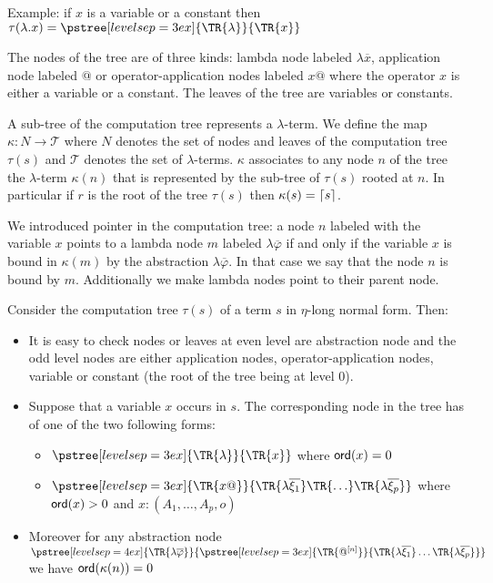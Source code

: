 Example: if $x$ is a variable or a constant then
$ \cmptre{\lambda . x} =
  \pstree[levelsep=3ex]
    { \TR{\lambda } }
    { \TR{x}
    }$

The nodes of the tree are of three kinds: lambda node labeled
 $\lambda \overline{x}$, application node labeled $@$ or
operator-application nodes labeled $x @$ where the operator $x$ is
either a variable or a constant. The leaves of the tree are
variables or constants.

A sub-tree of the computation tree represents a $\lambda$-term. We
define the map $\kappa : N \rightarrow \mathcal{T}$ where $N$
denotes the set of nodes and leaves of the computation tree
$\tau(s)$ and $\mathcal{T}$ denotes the set of $\lambda$-terms.
$\kappa$ associates to any node $n$ of the tree the $\lambda$-term
$\kappa(n)$ that is represented by the sub-tree of $\tau(s)$ rooted
at $n$. In particular if $r$ is the root of the tree $\tau(s)$ then
$\kappa(s) = \lceil s\rceil$.

We introduced pointer in the computation tree: a node $n$ labeled
with the variable $x$ points to a lambda node $m$ labeled $\lambda
\overline{\varphi}$ if and only if the variable $x$ is bound in
$\kappa(m)$ by the abstraction $\lambda \overline{\varphi}$. In that
case we say that the node $n$ is bound by $m$. Additionally we make
lambda nodes point to their parent node.


Consider the computation tree $\tau(s)$ of a term $s$ in $\eta$-long normal form. Then:
\begin{itemize}
\item It is easy to check nodes or leaves at even level are abstraction
node and the odd level nodes are either application nodes,
operator-application nodes, variable or constant (the root of the
tree being at level $0$).

\item Suppose that a variable $x$ occurs in $s$. The corresponding node in the tree has of one of the two following forms:
    \begin{itemize}
    \item $ \pstree[levelsep=3ex]
        { \TR{\lambda } }
        { \TR{x}
        }$ where ${\sf ord}(x) = 0$

    \item $ \pstree[levelsep=3ex]
                { \TR{x @} }
                { \TR{\lambda \overline{\xi_1}} \TR{\ldots} \TR{\lambda \overline{\xi_p}}}
        $ where ${\sf ord}(x) > 0$ and $x:(A_1,\ldots,A_p,o)$
    \end{itemize}

\item    Moreover for any abstraction node
        $ \pstree[levelsep=4ex]
            { \TR{\lambda \overline{\varphi}} }
            { \pstree[levelsep=3ex]
                {\TR{@^{[n]}}}
                {\TR{\lambda \overline{\xi_1}} \ldots \TR{\lambda \overline{\xi_p}}}
            }
        $
    we have ${\sf ord}(\kappa(n))=0$

\end{itemize}


